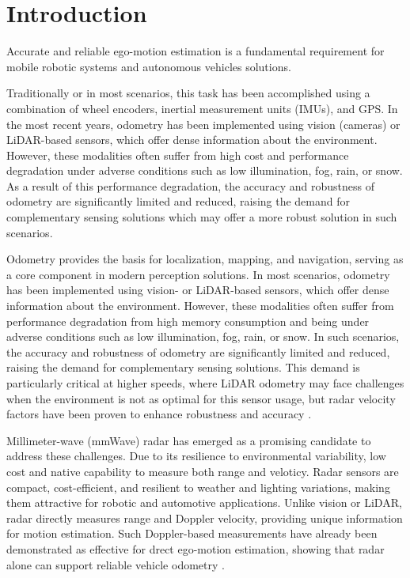 \section{Introduction}
\label{sec:intoduction}

Accurate and reliable ego-motion estimation is a fundamental requirement for mobile robotic systems and autonomous vehicles solutions.

Traditionally or in most scenarios, this task has been accomplished using a combination of wheel encoders, inertial measurement units (IMUs), and GPS.
In the most recent years, odometry has been implemented using vision (cameras) or LiDAR-based sensors, which offer dense information about the environment.
However, these modalities often suffer from high cost and performance degradation under adverse conditions such as low illumination, fog, rain, or snow.
As a result of this performance degradation, the accuracy and robustness of odometry are significantly limited and reduced, raising the demand for complementary sensing solutions which may offer a more robust solution in such scenarios.

Odometry provides the basis for localization, mapping, and navigation, serving as a core component in modern perception solutions.  
In most scenarios, odometry has been implemented using vision- or LiDAR-based sensors, which offer dense information about the environment.  
However, these modalities often suffer from performance degradation from high memory consumption and being under adverse conditions such as low illumination, fog, rain, or snow.  
In such scenarios, the accuracy and robustness of odometry are significantly limited and reduced, raising the demand for complementary sensing solutions.  
This demand is particularly critical at higher speeds, where LiDAR odometry may face challenges when the environment is not as optimal for this sensor usage, but radar velocity factors have been proven to enhance robustness and accuracy \cite{HighSpeed_Estimation}.


Millimeter-wave (mmWave) radar has emerged as a promising candidate to address these challenges. Due to its resilience to environmental variability, low cost and native capability to measure both range and veloticy.
Radar sensors are compact, cost-efficient, and resilient to weather and lighting variations, making them attractive for robotic and automotive applications.  
Unlike vision or LiDAR, radar directly measures range and Doppler velocity, providing unique information for motion estimation.  
Such Doppler-based measurements have already been demonstrated as effective for drect ego-motion estimation, showing that radar alone can support reliable vehicle odometry \cite{EgoMotion_DopplerRadar}.

